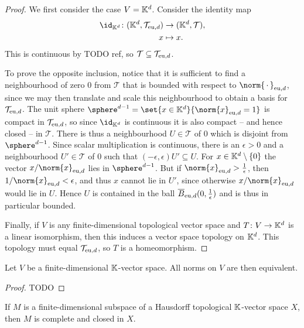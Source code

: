 \documentclass[article, a4paper, 11pt, oneside]{memoir}
\numberwithin{equation}{chapter}
\newcommand{\calT}{\mathcal{T}}
\begin{document}
\begin{proof}
    We first consider the case $V = \mathbb{K}^d$. Consider the identity map
    \begin{align*}
        \id_{\field^d} \colon (\field^d,\calT_{\eu,d}) &\to (\field^d,\calT), \\
        x &\mapsto x.
    \end{align*}
    This is continuous by TODO ref, so $\calT \subseteq \calT_{\eu,d}$.

    To prove the opposite inclusion, notice that it is sufficient to find a neighbourhood of zero $0$ from $\calT$ that is bounded with respect to $\norm{\,\cdot\,}_{\eu,d}$, since we may then translate and scale this neighbourhood to obtain a basis for $\calT_{\eu,d}$. The unit sphere $\sphere^{d-1} = \set{x \in \field^d}{\norm{x}_{\eu,d} = 1}$ is compact in $\calT_{\eu,d}$, so since $\id_{\field^d}$ is continuous it is also compact -- and hence closed -- in $\calT$. There is thus a neighbourhood $U \in \calT$ of $0$ which is disjoint from $\sphere^{d-1}$. Since scalar multiplication is continuous, there is an $\epsilon > 0$ and a neighbourhood $U' \in \calT$ of $0$ such that $(-\epsilon,\epsilon)U' \subseteq U$. For $x \in \mathbb{K}^d \setminus \{0\}$ the vector $x/\norm{x}_{\eu,d}$ lies in $\sphere^{d-1}$. But if $\norm{x}_{\eu,d} > \frac{1}{\epsilon}$, then $1/\norm{x}_{\eu,d} < \epsilon$, and thus $x$ cannot lie in $U'$, since otherwise $x/\norm{x}_{\eu,d}$ would lie in $U$. Hence $U$ is contained in the ball $\overline{B}_{\mathrm{eu},d}(0,\frac{1}{\epsilon})$ and is thus in particular bounded.

    Finally, if $V$ is any finite-dimensional topological vector space and $T \colon V \to \mathbb{K}^d$ is a linear isomorphism, then this induces a vector space topology on $\mathbb{K}^d$. This topology must equal $\calT_{\eu,d}$, so $T$ is a homeomorphism.
\end{proof}


\begin{corollary}
    Let $V$ be a finite-dimensional $\mathbb{K}$-vector space. All norms on $V$ are then equivalent.
\end{corollary}

\begin{proof}
    TODO
\end{proof}


\begin{corollary}
    \label{thm:finite-dimensional-subspace-closed}
    If $M$ is a finite-dimensional subspace of a Hausdorff topological $\mathbb{K}$-vector space $X$, then $M$ is complete and closed in $X$.
\end{corollary}
\end{document}
